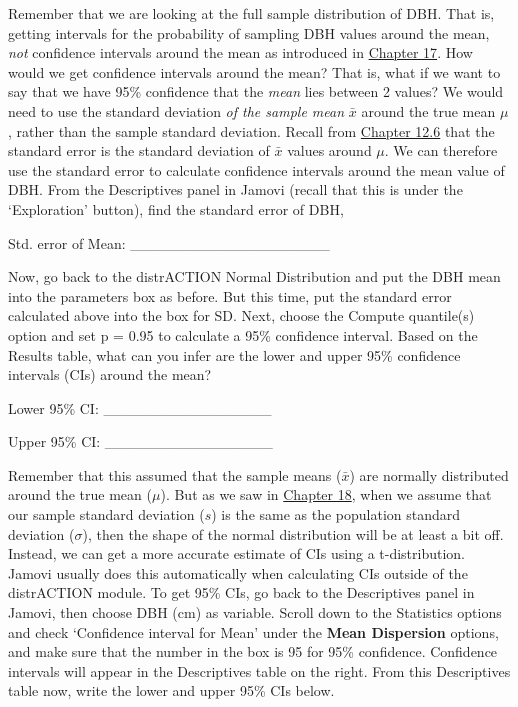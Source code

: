 \documentclass[
]{scrbook}
\begin{document}
Remember that we are looking at the full sample distribution of DBH.
That is, getting intervals for the probability of sampling DBH values around the mean, \emph{not} confidence intervals around the mean as introduced in \protect\hyperlink{Chapter_17}{Chapter 17}.
How would we get confidence intervals around the mean?
That is, what if we want to say that we have 95\% confidence that the \emph{mean} lies between 2 values?
We would need to use the standard deviation \emph{of the sample mean} \(\bar{x}\) around the true mean \(\mu\), rather than the sample standard deviation.
Recall from \href{Chapter_12.html\#the-standard-error}{Chapter 12.6} that the standard error is the standard deviation of \(\bar{x}\) values around \(\mu\).
We can therefore use the standard error to calculate confidence intervals around the mean value of DBH.
From the Descriptives panel in Jamovi (recall that this is under the `Exploration' button), find the standard error of DBH,

Std. error of Mean: \_\_\_\_\_\_\_\_\_\_\_\_\_\_\_\_\_\_\_

Now, go back to the distrACTION Normal Distribution and put the DBH mean into the parameters box as before.
But this time, put the standard error calculated above into the box for SD.
Next, choose the Compute quantile(s) option and set p = 0.95 to calculate a 95\% confidence interval.
Based on the Results table, what can you infer are the lower and upper 95\% confidence intervals (CIs) around the mean?

Lower 95\% CI: \_\_\_\_\_\_\_\_\_\_\_\_\_\_\_\_

Upper 95\% CI: \_\_\_\_\_\_\_\_\_\_\_\_\_\_\_\_

Remember that this assumed that the sample means (\(\bar{x}\)) are normally distributed around the true mean (\(\mu\)).
But as we saw in \protect\hyperlink{Chapter_18}{Chapter 18}, when we assume that our sample standard deviation (\(s\)) is the same as the population standard deviation (\(\sigma\)), then the shape of the normal distribution will be at least a bit off.
Instead, we can get a more accurate estimate of CIs using a t-distribution.
Jamovi usually does this automatically when calculating CIs outside of the distrACTION module.
To get 95\% CIs, go back to the Descriptives panel in Jamovi, then choose DBH (cm) as variable.
Scroll down to the Statistics options and check `Confidence interval for Mean' under the \textbf{Mean Dispersion} options, and make sure that the number in the box is 95 for 95\% confidence.
Confidence intervals will appear in the Descriptives table on the right.
From this Descriptives table now, write the lower and upper 95\% CIs below.
\end{document}
